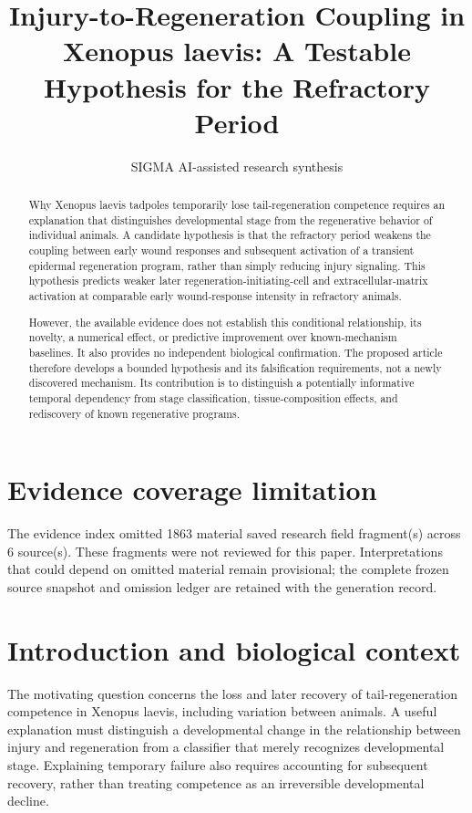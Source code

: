 \documentclass[11pt]{article}
\title{Injury-to-Regeneration Coupling in Xenopus laevis: A Testable Hypothesis for the Refractory Period}
\date{}
\author{SIGMA AI-assisted research synthesis}
\begin{document}
\maketitle

\begin{abstract}
Why Xenopus laevis tadpoles temporarily lose tail-regeneration competence requires an explanation that distinguishes developmental stage from the regenerative behavior of individual animals. A candidate hypothesis is that the refractory period weakens the coupling between early wound responses and subsequent activation of a transient epidermal regeneration program, rather than simply reducing injury signaling. This hypothesis predicts weaker later regeneration-initiating-cell and extracellular-matrix activation at comparable early wound-response intensity in refractory animals.

However, the available evidence does not establish this conditional relationship, its novelty, a numerical effect, or predictive improvement over known-mechanism baselines. It also provides no independent biological confirmation. The proposed article therefore develops a bounded hypothesis and its falsification requirements, not a newly discovered mechanism. Its contribution is to distinguish a potentially informative temporal dependency from stage classification, tissue-composition effects, and rediscovery of known regenerative programs.
\end{abstract}
\section*{Evidence coverage limitation}
The evidence index omitted 1863 material saved research field fragment(s) across 6 source(s). These fragments were not reviewed for this paper. Interpretations that could depend on omitted material remain provisional; the complete frozen source snapshot and omission ledger are retained with the generation record.
\section{Introduction and biological context}
The motivating question concerns the loss and later recovery of tail-regeneration competence in Xenopus laevis, including variation between animals. A useful explanation must distinguish a developmental change in the relationship between injury and regeneration from a classifier that merely recognizes developmental stage. Explaining temporary failure also requires accounting for subsequent recovery, rather than treating competence as an irreversible developmental decline.
\end{document}
